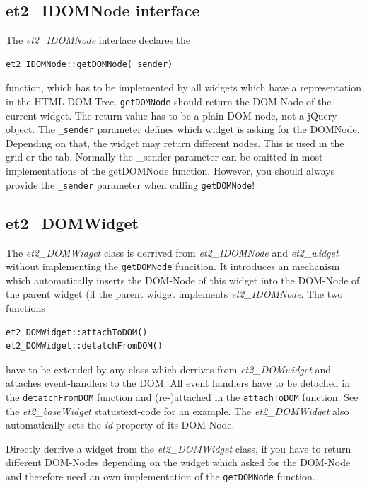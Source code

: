 \documentclass[10pt,a4paper]{report}
\begin{document}
\subsection*{et2\_IDOMNode interface}
The \textit{et2\_IDOMNode} interface declares the
\begin{verbatim}
et2_IDOMNode::getDOMNode(_sender)
\end{verbatim}
function, which has to be implemented by all widgets which have a representation in the HTML-DOM-Tree. \texttt{getDOMNode} should return the DOM-Node of the current widget. The return value has to be a plain DOM node, not a jQuery object. The \texttt{\_sender} parameter defines which widget is asking for the DOMNode. Depending on that, the widget may return different nodes. This is used in the grid or the tab. Normally the \_sender parameter can be omitted in most implementations of the getDOMNode function. However, you should always provide the \texttt{\_sender} parameter when calling \texttt{getDOMNode}!

\subsection*{et2\_DOMWidget}
The \textit{et2\_DOMWidget} class is derrived from \textit{et2\_IDOMNode} and \textit{et2\_widget} without implementing the \texttt{getDOMNode} funcition. It  introduces an mechanism which automatically inserts the DOM-Node of this widget into the DOM-Node of the parent widget (if the parent widget implements \textit{et2\_IDOMNode}. The two functions
\begin{verbatim}
et2_DOMWidget::attachToDOM()
et2_DOMWidget::detatchFromDOM()
\end{verbatim}
have to be extended by any class which derrives from \textit{et2\_DOMwidget} and attaches event-handlers to the DOM. All event handlers have to be detached in the \texttt{detatchFromDOM} function and (re-)attached in the \texttt{attachToDOM} function. See the \textit{et2\_baseWidget} statustext-code for an example. The \textit{et2\_DOMWidget} also automatically sets the \textit{id} property of its DOM-Node.

Directly derrive a widget from the \textit{et2\_DOMWidget} class, if you have to return different DOM-Nodes depending on the widget which asked for the DOM-Node and therefore need an own implementation of the \texttt{getDOMNode} function.
\end{document}
